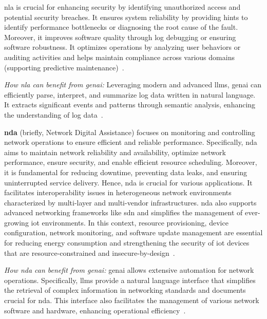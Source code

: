 \gls{nla} is crucial for enhancing security by identifying unauthorized access and potential security breaches. It ensures system reliability by providing hints to identify performance bottlenecks or diagnosing the root cause of the fault. Moreover, it improves software quality through log debugging or ensuring software robustness. It optimizes operations by analyzing user behaviors or auditing activities and helps maintain compliance across various domains (\eg supporting predictive maintenance)~\cite{he2021survey}.

\noindent
\emph{How \gls{nla}  
can benefit from \gls{genai}: }
Leveraging modern and advanced \glspl{llm}, \gls{genai} can efficiently parse, interpret, and summarize log data written in natural language. It extracts significant events and patterns through semantic analysis, enhancing the understanding of log data~\cite{han2023loggpt,boffa2024logprecis}.


\vspace{5pt}
\noindent
\textbf{\gls{nda}} (briefly, Network Digital Assistance) 
focuses on monitoring and controlling network operations to ensure efficient and reliable performance.
Specifically, \gls{nda} aims to maintain network reliability and availability, optimize network performance, ensure security, and enable efficient resource scheduling.
%
Moreover, it is fundamental for reducing downtime, preventing data leaks, and ensuring uninterrupted service delivery.
%
Hence, \gls{nda} is crucial for various applications. 
It facilitates interoperability issues in heterogeneous network environments characterized by multi-layer and multi-vendor infrastructures. \gls{nda} also supports advanced networking frameworks like \gls{sdn} %
and simplifies the management of ever-growing \gls{iot} environments. 
In this context, resource provisioning, device configuration, network monitoring, and software update management are essential for reducing energy consumption and strengthening the security of 
\gls{iot} devices that are resource-constrained and insecure-by-design~\cite{martinez2014network, aarikka2017network, aboubakar2022review}.

\noindent
\emph{How \gls{nda} 
can benefit from \gls{genai}: }
\gls{genai} allows extensive automation for network operations.
Specifically, \glspl{llm} provide a natural language interface that simplifies the retrieval of complex information in networking standards and documents crucial for \gls{nda}. 
This interface also facilitates the management of various network software and hardware,
enhancing operational efficiency~\cite{wang2023network}.

